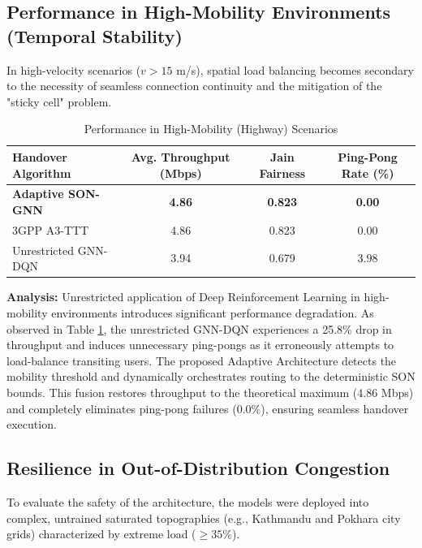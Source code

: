 \subsection{Performance in High-Mobility Environments (Temporal Stability)}
In high-velocity scenarios ($v > 15$ m/s), spatial load balancing becomes secondary to the necessity of seamless connection continuity and the mitigation of the "sticky cell" problem.

\begin{table}[htbp]
\caption{Performance in High-Mobility (Highway) Scenarios}
\begin{center}
\begin{tabular}{|l|c|c|c|}
\hline
\textbf{Handover Algorithm} & \textbf{Avg. Throughput (Mbps)} & \textbf{Jain Fairness} & \textbf{Ping-Pong Rate (\%)} \\
\hline
\textbf{Adaptive SON-GNN} & \textbf{4.86} & \textbf{0.823} & \textbf{0.00} \\
3GPP A3-TTT & 4.86 & 0.823 & 0.00 \\
Unrestricted GNN-DQN & 3.94 & 0.679 & 3.98 \\
\hline
\end{tabular}
\label{tab:highway}
\end{center}
\end{table}

\textbf{Analysis:} Unrestricted application of Deep Reinforcement Learning in high-mobility environments introduces significant performance degradation. As observed in Table \ref{tab:highway}, the unrestricted GNN-DQN experiences a 25.8\% drop in throughput and induces unnecessary ping-pongs as it erroneously attempts to load-balance transiting users. The proposed Adaptive Architecture detects the mobility threshold and dynamically orchestrates routing to the deterministic SON bounds. This fusion restores throughput to the theoretical maximum (4.86 Mbps) and completely eliminates ping-pong failures (0.0\%), ensuring seamless handover execution.

\subsection{Resilience in Out-of-Distribution Congestion}
To evaluate the safety of the architecture, the models were deployed into complex, untrained saturated topographies (e.g., Kathmandu and Pokhara city grids) characterized by extreme load ($\geq 35\%$).

